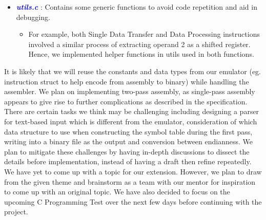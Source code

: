 \documentclass[11pt]{article}
\begin{document}
\begin{itemize}
\begin{itemize}
	\end{itemize}
	\item \textcolor{blue}{\textbf{\emph{utils.c}}} : Contains some generic functions to avoid code repetition and aid in debugging.
	\begin{itemize}
	\item For example, both Single Data Transfer and Data Processing instructions involved a similar process of extracting operand 2 as a shifted register. Hence, we implemented helper functions in utils used in 		  both functions.
	\end{itemize}
\end{itemize}

\begin{flushleft}
It is likely that we will reuse the constants and data types from our emulator (eg. instruction struct to help encode from assembly to binary) while handling the assembler. We plan on implementing two-pass assembly, as single-pass assembly appears to give rise to further complications as described in the specification. There are certain tasks we think may be challenging including designing a parser for text-based input which is different from the emulator, consideration of which data structure to use when constructing the symbol table during the first pass, writing into a binary file as the output and conversion between endianness. We plan to mitigate these challenges by having in-depth discussions to dissect the details before implementation, instead of having a draft then refine repeatedly. We have yet to come up with a topic for our extension. However, we plan to draw from the given theme and brainstorm as a team with our mentor for inspiration to come up with an original topic. We have also decided to focus on the upcoming C Programming Test over the next few days before continuing with the project. 
\end{flushleft}
\end{document}
